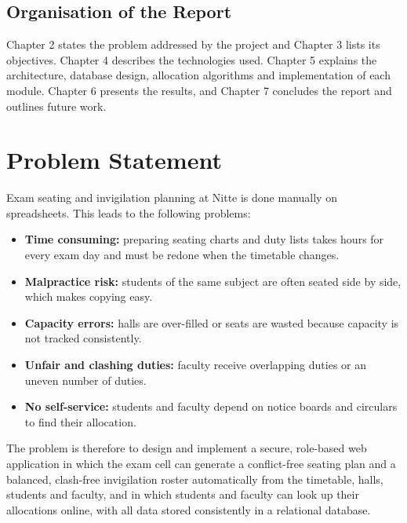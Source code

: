 \documentclass[12pt,letterpaper]{article}
\renewcommand{\thesection}{\arabic{section}}
\newcommand{\chapter}[1]{\clearpage\refstepcounter{section}\section*{#1}\label{ch:\thesection}}
\begin{document}
\subsection{Organisation of the Report}
Chapter 2 states the problem addressed by the project and Chapter 3 lists its objectives. Chapter 4 describes the technologies used. Chapter 5 explains the architecture, database design, allocation algorithms and implementation of each module. Chapter 6 presents the results, and Chapter 7 concludes the report and outlines future work.

\chapter{Problem Statement}
Exam seating and invigilation planning at Nitte is done manually on spreadsheets. This leads to the following problems:
\begin{itemize}
  \item \textbf{Time consuming:} preparing seating charts and duty lists takes hours for every exam day and must be redone when the timetable changes.
  \item \textbf{Malpractice risk:} students of the same subject are often seated side by side, which makes copying easy.
  \item \textbf{Capacity errors:} halls are over-filled or seats are wasted because capacity is not tracked consistently.
  \item \textbf{Unfair and clashing duties:} faculty receive overlapping duties or an uneven number of duties.
  \item \textbf{No self-service:} students and faculty depend on notice boards and circulars to find their allocation.
\end{itemize}
The problem is therefore to design and implement a secure, role-based web application in which the exam cell can generate a conflict-free seating plan and a balanced, clash-free invigilation roster automatically from the timetable, halls, students and faculty, and in which students and faculty can look up their allocations online, with all data stored consistently in a relational database.
\end{document}
